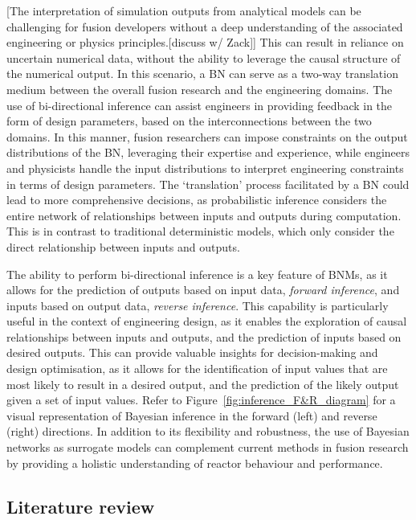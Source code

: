 \documentclass[journal]{IEEEtran}
\begin{document}
[The interpretation of simulation outputs from analytical models can be challenging for fusion developers without a deep understanding of the associated engineering or physics principles.[discuss w/ Zack]] This can result in reliance on uncertain numerical data, without the ability to leverage the causal structure of the numerical output. In this scenario, a BN can serve as a two-way translation medium between the overall fusion research and the engineering domains. The use of bi-directional inference can assist engineers in providing feedback in the form of design parameters, based on the interconnections between the two domains. In this manner, fusion researchers can impose constraints on the output distributions of the BN, leveraging their expertise and experience, while engineers and physicists handle the input distributions to interpret engineering constraints in terms of design parameters. The `translation' process facilitated by a BN could lead to more comprehensive decisions, as probabilistic inference considers the entire network of relationships between inputs and outputs during computation. This is in contrast to traditional deterministic models, which only consider the direct relationship between inputs and outputs. 

The ability to perform bi-directional inference is a key feature of BNMs, as it allows for the prediction of outputs based on input data, \textit{forward inference}, and inputs based on output data, \textit{reverse inference}. This capability is particularly useful in the context of engineering design, as it enables the exploration of causal relationships between inputs and outputs, and the prediction of inputs based on desired outputs. This can provide valuable insights for decision-making and design optimisation, as it allows for the identification of input values that are most likely to result in a desired output, and the prediction of the likely output given a set of input values. Refer to Figure~\ref{fig:inference_F&R_diagram} for a visual representation of Bayesian inference in the forward (left) and reverse (right) directions. In addition to its flexibility and robustness, the use of Bayesian networks as surrogate models can complement current methods in fusion research by providing a holistic understanding of reactor behaviour and performance. 
    
\subsection{Literature review}~\label{sec:background}
\end{document}
